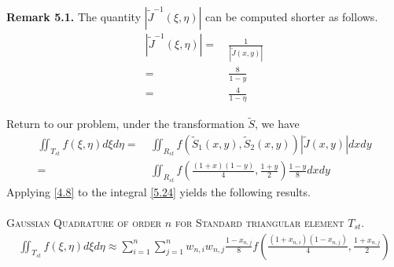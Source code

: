 \documentclass[a4paper]{article}
\numberwithin{equation}{section}
\begin{document}
\textbf{Remark 5.1.} The quantity $\left| {{{\widetilde J}^{ - 1}}\left( {\xi ,\eta } \right)} \right|$ can be computed shorter as follows.
\begin{align}
\left| {{{\widetilde J}^{ - 1}}\left( {\xi ,\eta } \right)} \right| =&\ \frac{1}{{\left| {\widetilde J\left( {x,y} \right)} \right|}}\\
=&\ \frac{8}{{1 - y}}\\
=&\ \frac{4}{{1 - \eta }}
\end{align}

Return to our problem, under the transformation $\widetilde S$, we have
\begin{align}
  \iint_{{T_{st}}} {f\left( {\xi ,\eta } \right)d\xi d\eta } =&\ \iint_{{R_{st}}} {f\left( {{{\widetilde S}_1}\left( {x,y} \right),{{\widetilde S}_2}\left( {x,y} \right)} \right)\left| {\widetilde J\left( {x,y} \right)} \right|dxdy}\\
   =&\ \iint_{{R_{st}}} {f\left( {\frac{{\left( {1 + x} \right)\left( {1 - y} \right)}}{4},\frac{{1 + y}}{2}} \right)\frac{{1 - y}}{8}dxdy} \label{5.24}
\end{align}
Applying \eqref{4.8} to the integral \eqref{5.24} yields the following results.\\
\\
\textsc{Gaussian Quadrature of order $n$ for Standard triangular element $T_{st}$.}
\begin{align}
\iint_{{T_{st}}} {f\left( {\xi ,\eta } \right)d\xi d\eta } \approx \sum\limits_{i = 1}^n {\sum\limits_{j = 1}^n {{w_{n,i}}{w_{n,j}}\frac{{1 - {x_{n,j}}}}{8}f\left( {\frac{{\left( {1 + {x_{n,i}}} \right)\left( {1 - {x_{n,j}}} \right)}}{4},\frac{{1 + {x_{n,j}}}}{2}} \right)} } 
\end{align}
\end{document}
